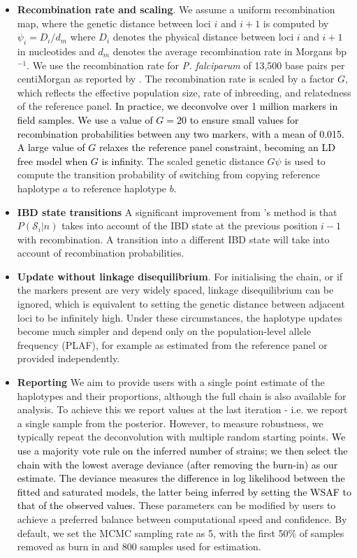 \documentclass[9pt]{article}
\newcounter{todocounter}
\newcommand{\todonum}[2][]
{\stepcounter{todocounter}\todo[#1]{\thetodocounter: #2}}
\begin{document}
\begin{itemize}
\begin{itemize}
\todonum{Minor Comment 6, on the scaling parameter G }
\item {\bf Recombination rate and scaling}. We assume a uniform recombination map, where the genetic distance between loci $i$ and $i+1$ is computed by $\psi_i = D_i / d_m$ where $D_i$ denotes the physical distance between loci $i$ and $i+1$ in nucleotides and $d_m$ denotes the average recombination rate in Morgans bp$^{-1}$. We use the recombination rate for {\it P. falciparum} of 13,500 base pairs per centiMorgan as reported by \citet{Miles2016}. The recombination rate is scaled by a factor $G$, which reflects the effective population size, rate of inbreeding, and relatedness of the reference panel. \textcolor{black}{In practice, we deconvolve over 1 million markers in field samples. We use a value of $G=20$ to ensure small values for recombination probabilities between any two markers, with a mean of 0.015. A large value of $G$ relaxes the reference panel constraint, becoming an LD free model when $G$ is infinity.}  The scaled genetic distance $G\psi$ is used to compute the transition probability of switching from copying reference haplotype $a$ to reference haplotype $b$.

\item {\bf IBD state transitions} A significant improvement from \citet{Zhu2017}'s method is that $P(\mathcal{S}_{i}|n)$ takes into account of the IBD state at the previous position $i-1$ with recombination. A transition into a different IBD state will take into account of recombination probabilities.

\item {\bf Update without linkage disequilibrium}. For initialising the chain, or if the markers present are very widely spaced, linkage disequilibrium can be ignored, which is equivalent to setting the genetic distance between adjacent loci to be infinitely high.  Under these circumstances, the haplotype updates become much simpler and depend only on the population-level allele frequency (PLAF), for example as estimated from the reference panel or provided independently.

\item {\bf Reporting} We aim to provide users with a single point estimate of the haplotypes and their proportions, although the full chain is also available for analysis.  To achieve this we report values at the last iteration - i.e. we report a single sample from the posterior.  However, to measure robustness, we typically repeat the deconvolution with multiple random starting points\textcolor{black}{. We use a majority vote rule on the inferred number of strains; we then select the chain with the lowest average deviance (after removing the burn-in) as our estimate. The deviance measures the difference in log likelihood between the fitted and saturated models, the latter being inferred by setting the WSAF to that of the observed values.} These parameters can be modified by users to achieve a preferred balance between computational speed and confidence.  By default, we set the MCMC sampling rate as 5, with the first 50\% of samples removed as burn in and 800 samples used for estimation.


\end{itemize}
\end{itemize}
\end{document}
